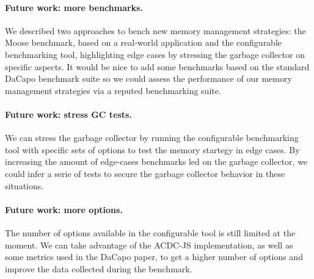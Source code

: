 \documentclass[10pt, sigplan]{acmart}
\begin{document}
\paragraph{Future work: more benchmarks.}
We described two approaches to bench new memory management strategies: the Moose benchmark, based on a real-world application and the configurable benchmarking tool, highlighting edge cases by stressing the garbage collector on specific aspects. It would be nice to add some benchmarks based on the standard DaCapo benchmark suite so we could assess the performance of our memory management strategies via a reputed benchmarking suite.

\paragraph{Future work: stress GC tests.}
We can stress the garbage collector by running the configurable benchmarking tool with specific sets of options to test the memory startegy in edge cases. By increasing the amount of edge-cases benchmarks led on the garbage collector, we could infer a serie of tests to secure the garbage collector behavior in these situations.

\paragraph{Future work: more options.}
The number of options available in the configurable tool is still limited at the moment. We can take advantage of the ACDC-JS implementation, as well as some metrics used in the DaCapo paper, to get a higher number of options and improve the data collected during the benchmark.



\end{document}
